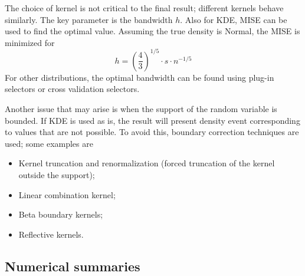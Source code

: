 The choice of kernel is not critical to the final result; different kernels behave similarly. The key parameter is the bandwidth $h$. Also for KDE, MISE can be used to find the optimal value. Assuming the true density is Normal, the MISE is minimized for
\begin{equation*}
    h = \left (\frac{4}{3} \right )^{1/5} \cdot s \cdot n^{-1/5}
\end{equation*}
For other distributions, the optimal bandwidth can be found using plug-in selectors or cross validation selectors.

Another issue that may arise is when the support of the random variable is bounded. If KDE is used as is, the result will present density event corresponding to values that are not possible. To avoid this, boundary correction techniques are used; some examples are
\begin{itemize}
    \item Kernel truncation and renormalization (forced truncation of the kernel outside the support);
    \item Linear combination kernel;
    \item Beta boundary kernels;
    \item Reflective kernels.
\end{itemize}

\subsection{Numerical summaries}

